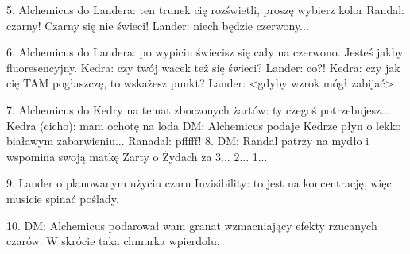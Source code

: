 \documentclass[10pt,twoside,twocolumn]{book}
\begin{document}
5. Alchemicus do Landera: ten trunek cię rozświetli, proszę wybierz kolor
Randal: czarny! Czarny się nie świeci!
Lander: niech będzie czerwony...


6. Alchemicus do Landera: po wypiciu świecisz się cały na czerwono. Jesteś jakby fluoresencyjny.
Kedra: czy twój wacek też się świeci?
Lander: co?!
Kedra: czy jak cię TAM pogłaszczę, to wskażesz punkt?
Lander: <gdyby wzrok mógł zabijać>

7. Alchemicus do Kedry na temat zboczonych żartów: ty czegoś potrzebujesz...
Kedra (cicho): mam ochotę na loda
DM: Alchemicus podaje Kedrze płyn o lekko białawym zabarwieniu...
Ranadal: pfffff!
8. DM: Randal patrzy na mydło i wspomina swoją matkę
Żarty o Żydach za 3... 2... 1...

9. Lander o planowanym użyciu czaru Invisibility: to jest na koncentrację, więc musicie spinać poślady.

10. DM: Alchemicus podarował wam granat wzmacniający efekty rzucanych czarów. W skrócie taka chmurka wpierdolu.
\end{document}
